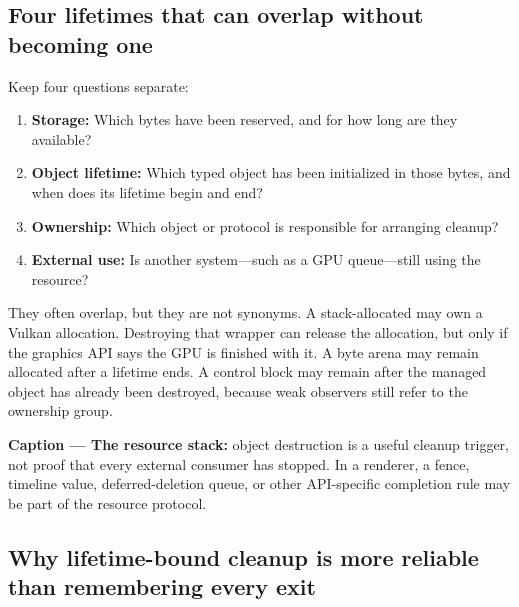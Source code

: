 \subsection{Four lifetimes that can overlap without becoming one}\label{01-foundations-i-ch004-four-lifetimes-that-can-overlap-without-becoming-one}

\hypertarget{01-foundations-i-ch004-four-lifetimes-that-can-overlap-without-becoming-one}{}

Keep four questions separate:

\begin{enumerate}
\def\labelenumi{\arabic{enumi}.}
\tightlist
\item
  \textbf{Storage:} Which bytes have been reserved, and for how long are they available?
\item
  \textbf{Object lifetime:} Which typed object has been initialized in those bytes, and when does its lifetime begin and end?
\item
  \textbf{Ownership:} Which object or protocol is responsible for arranging cleanup?
\item
  \textbf{External use:} Is another system---such as a GPU queue---still using the resource?
\end{enumerate}

They often overlap, but they are not synonyms. A stack-allocated  may own a Vulkan allocation. Destroying that wrapper can release the allocation, but only if the graphics API says the GPU is finished with it. A byte arena may remain allocated after a  lifetime ends. A  control block may remain after the managed object has already been destroyed, because weak observers still refer to the ownership group.


\textbf{Caption --- The resource stack:} object destruction is a useful cleanup trigger, not proof that every external consumer has stopped. In a renderer, a fence, timeline value, deferred-deletion queue, or other API-specific completion rule may be part of the resource protocol.

\subsection{Why lifetime-bound cleanup is more reliable than remembering every exit}\label{01-foundations-i-ch004-why-lifetime-bound-cleanup-is-more-reliable-than-remembering-every-exit}

